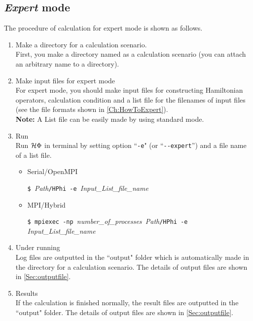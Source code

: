 \subsection{{\it Expert} mode}
The procedure of calculation for expert mode is shown as follows.
 \begin{enumerate}
   \item  Make a directory for a calculation scenario. \\
First, you make a directory named as a calculation scenario (you can attach an arbitrary name to a directory).
   \item  Make input files for expert mode\\
For expert mode,  you should make input files 
for constructing Hamiltonian operators, calculation condition and 
a list file for the filenames of input files (see the file formats shown in  \ref{Ch:HowToExpert}). \\
{\bf Note:} A List file can be easily made by using standard mode.
 \item  Run\\
Run $\mathcal{H} \Phi$ in terminal by setting option ``\verb|-e|" (or ``\verb|--expert|'') and a file name of a list file.\\

\begin{itemize}

\item Serial/OpenMPI

  \verb|$ |\textit{Path}\verb|/HPhi -e |\textit{Input\_List\_file\_name}
  
\item MPI/Hybrid

  \verb|$ mpiexec -np |\textit{number\_of\_processes}\verb| |\textit{Path}\verb|/HPhi -e |\textit{Input\_List\_file\_name}

\end{itemize}

\item Under running\\
Log files are outputted in the ``output" folder which is automatically made in the directory for a calculation scenario.
The details of output files are shown in \ref{Sec:outputfile}.

\item Results\\
If the calculation is finished normally, the result files are outputted in  the ``output" folder. The details of output files are shown in \ref{Sec:outputfile}.
\end{enumerate}
